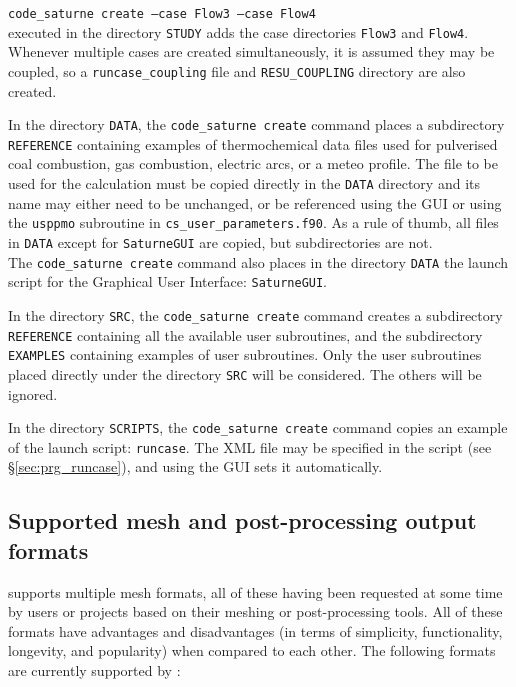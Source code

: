 {{{\noindent
\texttt{code\_saturne~create --case Flow3 --case Flow4}\\
executed in the directory \texttt{STUDY} adds the case directories
\texttt{Flow3} and \texttt{Flow4}. Whenever multiple cases are created simultaneously, it is assumed they may be coupled, so a \texttt{runcase\_coupling} file and \texttt{RESU\_COUPLING} directory are also created.

In the directory \texttt{DATA}, the \texttt{code\_saturne~create} command
places a subdirectory \texttt{REFERENCE} containing examples of thermochemical data files used for pulverised coal combustion, gas combustion, electric arcs, or a meteo profile. The file to be used for the calculation must be copied directly in the \texttt{DATA} directory and its name may either need to be unchanged, or be referenced using the GUI or using the \texttt{usppmo} subroutine in \texttt{cs\_user\_parameters.f90}. As a rule of thumb, all files in \texttt{DATA} except for \texttt{SaturneGUI} are copied, but subdirectories are not.\\
The \texttt{code\_saturne~create} command also places in the directory
\texttt{DATA} the launch script for the Graphical User Interface:
\texttt{SaturneGUI}.

In the directory \texttt{SRC}, the \texttt{code\_saturne~create} command creates a
subdirectory \texttt{REFERENCE} containing all the available user subroutines,
and the subdirectory \texttt{EXAMPLES} containing examples of user subroutines.
Only the user subroutines placed directly under
the directory \texttt{SRC} will be considered. The others will be ignored.

In the directory \texttt{SCRIPTS}, the \texttt{code\_saturne~create} command copies an example of the launch script: \texttt{runcase}.
The XML file may be specified in the script (see \S\ref{sec:prg_runcase}),
and using the GUI sets it automatically.

\smallskip \noindent

\subsection{Supported mesh and post-processing output formats
\label{sec:formats}}

\CS supports multiple mesh formats, all of these having been requested
at some time by users or projects based on their meshing or post-processing
tools. All of these formats have advantages and disadvantages (in terms
of simplicity, functionality, longevity, and popularity) when compared to
each other. The following formats are currently supported by \CS:

}}}
